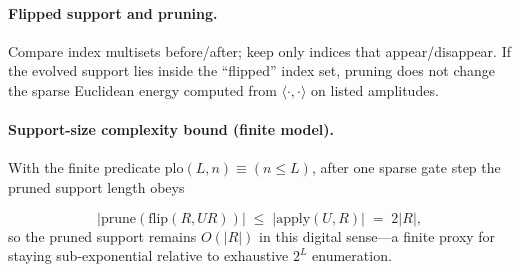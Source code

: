 \documentclass[11pt,a4paper]{article}
\theoremstyle{remark}
\begin{document}
\paragraph{Flipped support and pruning.}
Compare index multisets before/after; keep only indices that appear/disappear. If the evolved support lies inside the ``flipped'' index set, pruning does not change the sparse Euclidean energy computed from $\langle\cdot,\cdot\rangle$ on listed amplitudes.

\paragraph{Support-size complexity bound (finite model).}
With the finite predicate $\mathrm{plo}(L,n)\equiv(n\le L)$, after one sparse gate step the pruned support length obeys

\begin{equation}
  \bigl|\mathrm{prune}(\mathrm{flip}(R,U R))\bigr|
  \;\le\; \bigl|\mathrm{apply}(U,R)\bigr|
  \;=\; 2|R|,
\end{equation}
so the pruned support remains $O(|R|)$ in this digital sense---a finite proxy for staying sub-exponential relative to exhaustive $2^L$ enumeration.
\end{document}
